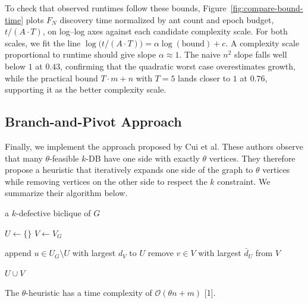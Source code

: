 \documentclass[conference]{IEEEtran}
\begin{document}
To check that observed runtimes follow these bounds, Figure~\ref{fig:compare-bound-time} plots $F_N$ discovery time normalized by ant count and epoch budget, $t/(A\cdot T)$, on log--log axes against each candidate complexity scale. For both scales, we fit the line $\log\!\bigl(t/(A\cdot T)\bigr) = \alpha\log(\mathrm{bound}) + c$. A complexity scale proportional to runtime should give slope $\alpha \approx 1$. The naive $n^2$ slope falls well below $1$ at $0.43$, confirming that the quadratic worst case overestimates growth, while the practical bound $T\cdot m+n$ with $T = 5$ lands closer to $1$ at $0.76$, supporting it as the better complexity scale.




\FloatBarrier
\subsection{Branch-and-Pivot Approach}


Finally, we implement the approach proposed by Cui et al. These authors observe that many $\theta$-feasible $k$-DB have one side with exactly $\theta$ vertices. They therefore propose a heuristic that iteratively expands one side of the graph to $\theta$ vertices while removing vertices on the other side to respect the $k$ constraint. We summarize their algorithm below.


\begin{algorithm}[H]
\caption{$\theta$-Heuristic}
\begin{minipage}{\linewidth}
\begin{algorithmic}


   \Ensure a $k$-defective biclique of $G$


       \State $U\gets \{\}$
       \State $V \gets V_G$


           \State append $u \in U_G \setminus U$ with largest $d_V$ to $U$
               \State remove $v \in V$ with largest $\bar{d}_U$ from $V$
           \EndWhile
       \EndWhile


       \State \Return $U \cup V$
   \EndFunction
  
\end{algorithmic}
\end{minipage}
\end{algorithm}


The $\theta$-heuristic has a time complexity of $\mathcal{O}(\theta n + m)$ [1].
\end{document}
